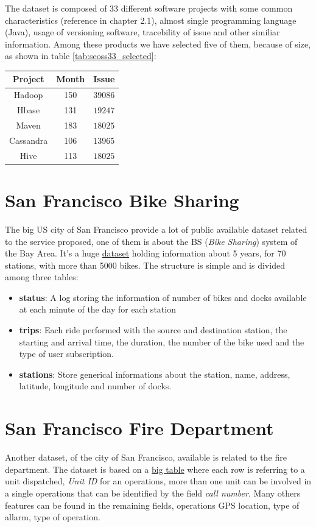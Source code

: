 \documentclass[%
    corpo=12pt,
    twoside,
    oldstyle,
    autoretitolo,
    greek,
    evenboxes,
]{toptesi}
\begin{document}
The dataset is composed of 33 different software projects with some common characteristics (reference in  \cite{SEOSS33} chapter 2.1), almost single programming language (Java), usage of versioning software, tracebility of issue and other similiar information. Among these products we have selected five of them, because of size, as shown in table \ref{tab:seoss33_selected}:

\begin{center}
   \label{tab:seoss33_selected}
  \begin{tabular}{ |c|c|c| }
     \hline
     \textbf{Project} & \textbf{Month} & \textbf{Issue} \\
     \hline
     \hline
     Hadoop & 150 & $39086$ \\
     Hbase & 131 & $19247$ \\
     Maven & 183 & $18025$ \\
     Cassandra & 106 & $13965$ \\
     Hive & 113 & $18025$ \\
     \hline
  \end{tabular}
\end{center}


\section{San Francisco Bike Sharing}
The big US city of San Francisco provide a lot of public available dataset related to the service proposed, one of them is about the BS (\textit{Bike Sharing}) system of the Bay Area. It's a huge \href{https://www.kaggle.com/datasf/san-francisco}{dataset} holding information about 5 years, for 70 stations, with more than 5000 bikes.
The structure is simple and is divided among three tables:
\begin{itemize}
  \item \textbf{status}: A log storing the information of number of bikes and docks available at each minute of the day for each station
  \item \textbf{trips}: Each ride performed with the source and destination station, the starting and arrival time, the duration, the number of the bike used and the type of user subscription.
  \item \textbf{stations}: Store generical informations about the station, name, address, latitude, longitude and number of docks.
\end{itemize}

\section{San Francisco Fire Department}
Another dataset, of the city of San Francisco, available is related to the fire department. The dataset is based on a \href{https://data.sfgov.org/widgets/nuek-vuh3}{big table} where each row is referring to a unit dispatched, \textit{Unit ID} for an operations, more than one unit can be involved in a single operations that can be identified by the field \textit{call number}. Many others features can be found in the remaining fields, operations GPS location, type of allarm, type of operation.
\end{document}
